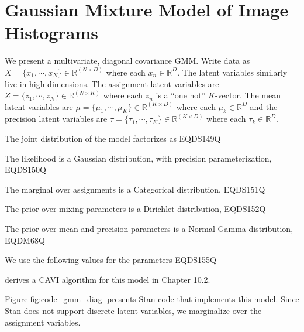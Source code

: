 \documentclass{article}
\begin{document}
\clearpage
\appendix
\section{Gaussian Mixture Model of Image Histograms}
\label{app:cavi}

We present a multivariate, diagonal covariance \gls{GMM}.
Write data as $X = \{x_1, \cdots, x_N \} \in {\mathbb{R}}^{(N \times D)}$ where
each $x_n \in {\mathbb{R}}^D$. The latent variables similarly live in high
dimensions. The assignment latent variables are
$Z = \{z_1, \cdots, z_N \} \in {\mathbb{R}}^{(N \times K)}$ 
where each $z_n$ is a ``one hot'' $K$-vector. The mean latent variables are
$\mu = \{\mu_1, \cdots, \mu_K \} \in {\mathbb{R}}^{(K \times D)}$ where 
each $\mu_k \in {\mathbb{R}}^D$ and the precision latent variables are
$\tau = \{\tau_1, \cdots, \tau_K \} \in {\mathbb{R}}^{(K \times D)}$ where each
$\tau_k \in {\mathbb{R}}^D$.

The joint distribution of the model factorizes as
EQDS149Q

The likelihood is a Gaussian distribution, with precision parameterization,
EQDS150Q

The marginal over assignments is a Categorical distribution,
EQDS151Q

The prior over mixing parameters is a Dirichlet distribution,
EQDS152Q

The prior over mean and precision parameters is a Normal-Gamma distribution,
EQDM68Q

We use the following values for the parameters
EQDS155Q

\citet{Bishop:2006} derives a \gls{CAVI} algorithm for this
model in Chapter 10.2.

Figure\nobreakspace \ref {fig:code_gmm_diag} presents Stan code that implements this model. Since
Stan does not support discrete latent variables, we marginalize over the
assignment variables.
\end{document}
